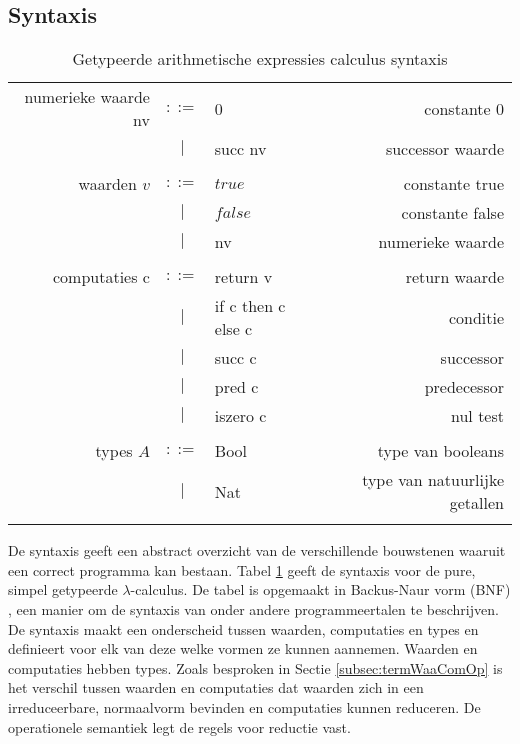 \subsection{Syntaxis}
\begin{table}
    \centering
    \begin{tabular}{|r c l r|}
    \hline 
         numerieke waarde nv & $::=$ & 0 & constante 0 \\
         & $|$ & succ nv & successor waarde \\
         & & & \\
         waarden $v$ & $::=$ & $true$ & constante true \\
         & $|$ & $false$ & constante false \\
         & $|$ & nv & numerieke waarde\\
         & & & \\
         computaties c & $::=$ & return v & return waarde \\
         & $|$ & if c then c else c & conditie\\
         & $|$ & succ c & successor \\
         & $|$ & pred c & predecessor \\
         & $|$ & iszero c & nul test \\
         & & & \\
        types $A$ & $::=$ & Bool & type van booleans \\
        & $|$ & Nat & type van natuurlijke getallen \\
         & & & \\
    \hline
    \end{tabular}
    \caption{Getypeerde arithmetische expressies calculus syntaxis}
    \label{fig:syntaxisSTLC}
\end{table}

De syntaxis geeft een abstract overzicht van de verschillende bouwstenen waaruit een correct programma kan bestaan. Tabel \ref{fig:syntaxisSTLC} geeft de syntaxis voor de pure, simpel getypeerde $\lambda$-calculus. De tabel is opgemaakt in Backus-Naur vorm (BNF) \cite{Backus2003}, een manier om de syntaxis van onder andere programmeertalen te beschrijven. De syntaxis maakt een onderscheid tussen waarden, computaties en types en definieert voor elk van deze welke vormen ze kunnen aannemen. Waarden en computaties hebben types. Zoals besproken in Sectie \ref{subsec:termWaaComOp} is het verschil tussen waarden en computaties dat waarden zich in een irreduceerbare, normaalvorm bevinden en computaties kunnen reduceren. De operationele semantiek legt de regels voor reductie vast.

